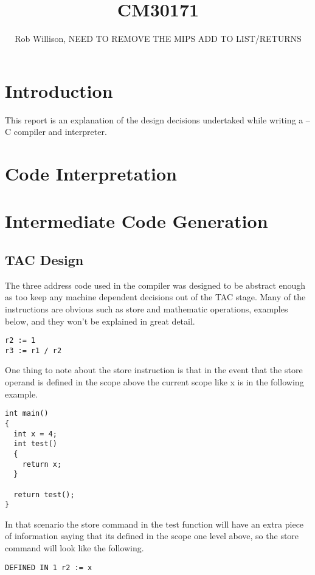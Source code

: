 \documentclass{article}
\begin{document}
\title{CM30171}
\author{Rob Willison, NEED TO REMOVE THE MIPS ADD TO LIST/RETURNS}

\maketitle
\tableofcontents

\section{Introduction}
This report is an explanation of the design decisions undertaked while writing
a --C compiler and interpreter.
\newpage
\section{Code Interpretation}

\section{Intermediate Code Generation}

\subsection{TAC Design}

The three address code used in the compiler was designed to be abstract enough as
too keep any machine dependent decisions out of the TAC stage. Many of the instructions
are obvious such as store and mathematic operations, examples below, and they won't be explained in
great detail.

\begin{lstlisting}
r2 := 1
r3 := r1 / r2
\end{lstlisting}

One thing to note about the store instruction is that in the event that the store
operand is defined in the scope above the current scope like x is in the following example.

\begin{lstlisting}
int main()
{
  int x = 4;
  int test()
  {
    return x;
  }

  return test();
}
\end{lstlisting}

In that scenario the store command in the test function will have an extra piece
of information saying that its defined in the scope one level above, so the store command will
look like the following.

\begin{lstlisting}
DEFINED IN 1 r2 := x
\end{lstlisting}
\end{document}
